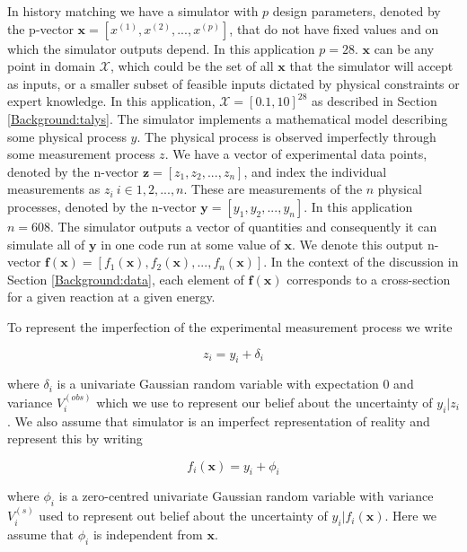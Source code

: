 \documentclass[
  12pt,
  a4paper,
  twoside]{book}
\begin{document}
In history matching we have a simulator with \(p\) design parameters, denoted by the p-vector \(\mathbf{x} = [x^{(1)}, x^{(2)},...,x^{(p)}]\), that do not have fixed values and on which the simulator outputs depend. In this application \(p=28\). \(\mathbf{x}\) can be any point in domain \(\mathcal{X}\), which could be the set of all \(\mathbf{x}\) that the simulator will accept as inputs, or a smaller subset of feasible inputs dictated by physical constraints or expert knowledge. In this application, \(\mathcal{X}=[0.1,10]^{28}\) as described in Section \ref{Background:talys}. The simulator implements a mathematical model describing some physical process \(y\). The physical process is observed imperfectly through some measurement process \(z\). We have a vector of experimental data points, denoted by the n-vector \(\mathbf{z} = [z_1,z_2,...,z_n]\), and index the individual measurements as \(z_i~i \in 1,2,...,n\). These are measurements of the \(n\) physical processes, denoted by the n-vector \(\mathbf{y} = [y_1,y_2,...,y_n]\). In this application \(n=608\). The simulator outputs a vector of quantities and consequently it can simulate all of \(\mathbf{y}\) in one code run at some value of \(\mathbf{x}\). We denote this output n-vector \(\mathbf{f}(\mathbf{x})= [f_1(\mathbf{x}), f_2(\mathbf{x}),...,f_n(\mathbf{x}) ]\). In the context of the discussion in Section \ref{Background:data}, each element of \(\mathbf{f(x)}\) corresponds to a cross-section for a given reaction at a given energy.

To represent the imperfection of the experimental measurement process we write

\begin{equation}
z_i = y_i + \delta_i
\label{eq:observation_uncertainty}
\end{equation}

where \(\delta_i\) is a univariate Gaussian random variable with expectation 0 and variance \(V^{(obs)}_i\) which we use to represent our belief about the uncertainty of \(y_i|z_i\). We also assume that simulator is an imperfect representation of reality and represent this by writing

\begin{equation}
f_i(\mathbf{x}) = y_i + \phi_i
\label{eq:model_inadequacy}
\end{equation}

where \(\phi_i\) is a zero-centred univariate Gaussian random variable with variance \(V_i^{(s)}\) used to represent out belief about the uncertainty of \(y_i|f_i(\mathbf{x})\). Here we assume that \(\phi_i\) is independent from \(\mathbf{x}\).
\end{document}
